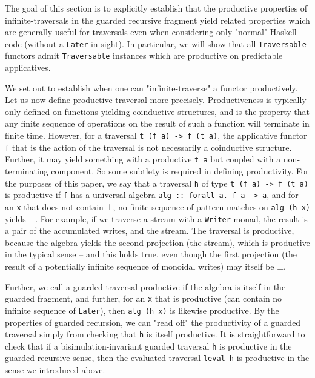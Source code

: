 \documentclass[sigplan,screen]{acmart}
\newcommand{\hs}{\texttt}
\newcommand{\hsn}{\texttt}
\begin{document}

The goal of this section is to explicitly establish that the productive properties of infinite-traversals in the guarded recursive fragment yield related properties which are generally useful for traversals even when considering only "normal" Haskell code (without a \hs{Later} in sight). In particular, we will show that all \hs{Traversable} functors admit \hs{Traversable} instances which are productive on predictable applicatives.

We set out to establish when one can "infinite-traverse" a functor productively. Let us now define productive traversal more precisely. Productiveness is typically only defined on functions yielding coinductive structures, and is the property that any finite sequence of operations on the result of such a function will terminate in finite time. However, for a traversal \hsn{t (f a) -> f (t a)}, the applicative functor \hs{f} that is the action of the traversal is not necessarily a coinductive structure. Further, it may yield something with a productive \hs{t a} but coupled with a non-terminating component. So some subtlety is required in defining productivity. For the purposes of this paper, we say that a traversal \hs{h} of type \hsn{t (f a) -> f (t a)} is productive if \hs{f} has a universal algebra \hs{alg :: forall a. f a -> a}, and for an \hs{x} that does not contain $\bot$, no finite sequence of pattern matches on \hsn{alg (h x)} yields $\bot$. For example, if we traverse a stream with a \hs{Writer} monad, the result is a pair of the accumulated writes, and the stream. The traversal is productive, because the algebra yields the second projection (the stream), which is productive in the typical sense -- and this holds true, even though the first projection (the result of a potentially infinite sequence of monoidal writes) may itself be $\bot$.

Further, we call a guarded traversal productive if the algebra is itself in the guarded fragment, and further, for an \hs{x} that is productive (can contain no infinite sequence of \hs{Later}), then \hsn{alg (h x)} is likewise productive. By the properties of guarded recursion, we can "read off" the productivity of a guarded traversal simply from checking that \hs{h} is itself productive. It is straightforward to check that if a bisimulation-invariant guarded traversal \hs{h} is productive in the guarded recursive sense, then the evaluated traversal \hs{leval h} is productive in the sense we introduced above.
\end{document}
